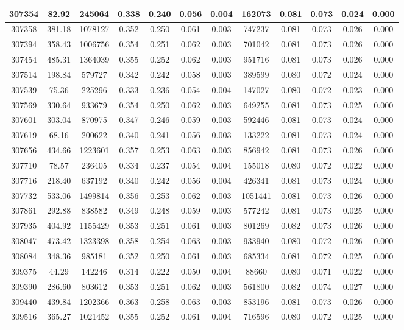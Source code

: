 \documentclass[10pt]{extarticle}
\begin{document}
\begin{longtable}{|c|c|c|c|c|c|c|c|c|c|c|c|}
\hline 
307354&82.92&245064&0.338&0.240&0.056&0.004&162073&0.081&0.073&0.024&0.000 \\ 
\hline 
307358&381.18&1078127&0.352&0.250&0.061&0.003&747237&0.081&0.073&0.026&0.000 \\ 
\hline 
307394&358.43&1006756&0.354&0.251&0.062&0.003&701042&0.081&0.073&0.026&0.000 \\ 
\hline 
307454&485.31&1364039&0.355&0.252&0.062&0.003&951716&0.081&0.073&0.026&0.000 \\ 
\hline 
307514&198.84&579727&0.342&0.242&0.058&0.003&389599&0.080&0.072&0.024&0.000 \\ 
\hline 
307539&75.36&225296&0.333&0.236&0.054&0.004&147027&0.080&0.072&0.023&0.000 \\ 
\hline 
307569&330.64&933679&0.354&0.250&0.062&0.003&649255&0.081&0.073&0.025&0.000 \\ 
\hline 
307601&303.04&870975&0.347&0.246&0.059&0.003&592446&0.081&0.073&0.024&0.000 \\ 
\hline 
307619&68.16&200622&0.340&0.241&0.056&0.003&133222&0.081&0.073&0.024&0.000 \\ 
\hline 
307656&434.66&1223601&0.357&0.253&0.063&0.003&856942&0.081&0.073&0.026&0.000 \\ 
\hline 
307710&78.57&236405&0.334&0.237&0.054&0.004&155018&0.080&0.072&0.022&0.000 \\ 
\hline 
307716&218.40&637192&0.340&0.242&0.056&0.004&426341&0.081&0.073&0.024&0.000 \\ 
\hline 
307732&533.06&1499814&0.356&0.253&0.062&0.003&1051441&0.081&0.073&0.026&0.000 \\ 
\hline 
307861&292.88&838582&0.349&0.248&0.059&0.003&577242&0.081&0.073&0.025&0.000 \\ 
\hline 
307935&404.92&1155429&0.353&0.251&0.061&0.003&801269&0.082&0.073&0.026&0.000 \\ 
\hline 
308047&473.42&1323398&0.358&0.254&0.063&0.003&933940&0.080&0.072&0.026&0.000 \\ 
\hline 
308084&348.36&985181&0.352&0.250&0.061&0.003&685334&0.081&0.072&0.025&0.000 \\ 
\hline 
309375&44.29&142246&0.314&0.222&0.050&0.004&88660&0.080&0.071&0.022&0.000 \\ 
\hline 
309390&286.60&803612&0.353&0.251&0.062&0.003&561800&0.082&0.074&0.027&0.000 \\ 
\hline 
309440&439.84&1202366&0.363&0.258&0.063&0.003&853196&0.081&0.073&0.026&0.000 \\ 
\hline 
309516&365.27&1021452&0.355&0.252&0.061&0.004&716596&0.080&0.072&0.025&0.000 \\ 

\end{longtable}
\end{document}
